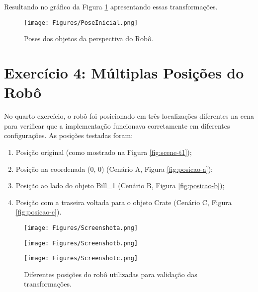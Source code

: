 Resultando no gráfico da Figura \ref{PoseInicial} apresentando essas transformações.

\begin{figure}[H]
\centering
\texttt{[image: Figures/PoseInicial.png]}
\caption{Poses dos objetos da perspectiva do Robô.}
\label{PoseInicial}
\end{figure}

\section{Exercício 4: Múltiplas Posições do Robô} \label{sec:ex4}

No quarto exercício, o robô foi posicionado em três localizações diferentes na cena para verificar que a implementação funcionava corretamente em diferentes configurações. As posições testadas foram:

\begin{enumerate}
    \item Posição original (como mostrado na Figura \ref{fig:scene-t1});
    \item Posição na coordenada (0, 0) (Cenário A, Figura \ref{fig:posicao-a});
    \item Posição ao lado do objeto Bill\_1 (Cenário B, Figura \ref{fig:posicao-b});
    \item Posição com a traseira voltada para o objeto Crate (Cenário C, Figura \ref{fig:posicao-c}).
\end{enumerate}

\begin{figure}[H]
\centering
\begin{minipage}[b]{0.45\textwidth}
    \texttt{[image: Figures/Screenshota.png]}
    \caption{Cenário A: Posição na coordenada (0, 0).}
    \label{fig:posicao-a}
\end{minipage}
\hfill
\begin{minipage}[b]{0.45\textwidth}
    \texttt{[image: Figures/Screenshotb.png]}
    \caption{Cenário B: Posição ao lado do Bill\_1.}
    \label{fig:posicao-b}
\end{minipage}

\vspace{0.5cm}
\begin{minipage}[b]{0.45\textwidth}
    \texttt{[image: Figures/Screenshotc.png]}
    \caption{Cenário C: Posição com traseira para o Crate.}
    \label{fig:posicao-c}
\end{minipage}
\caption{Diferentes posições do robô utilizadas para validação das transformações.}
\label{fig:multiplas-posicoes}
\end{figure}

